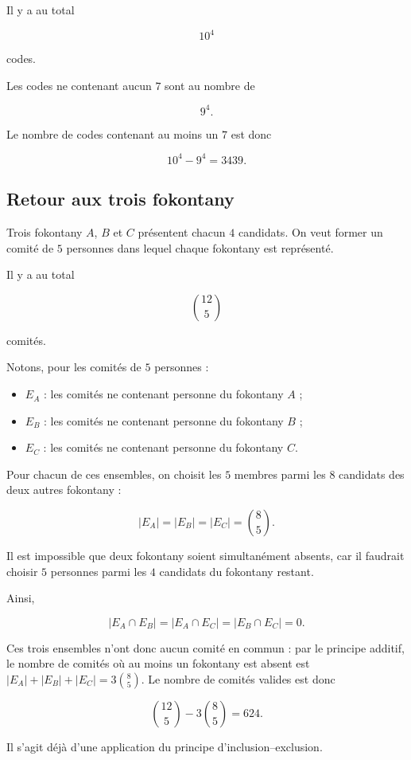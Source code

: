 Il y a au total

\[
10^4
\]

codes.

Les codes ne contenant aucun \(7\) sont au nombre de

\[
9^4.
\]

Le nombre de codes contenant au moins un \(7\) est donc

\[
\boxed{10^4-9^4=3439.}
\]

\subsection{Retour aux trois fokontany}

Trois fokontany \(A\), \(B\) et \(C\) présentent chacun \(4\) candidats.
On veut former un comité de \(5\) personnes dans lequel chaque fokontany est
représenté.

Il y a au total

\[
\binom{12}{5}
\]

comités.

Notons, pour les comités de \(5\) personnes :
\begin{itemize}
    \item \(E_A\) : les comités ne contenant personne du fokontany \(A\) ;
    \item \(E_B\) : les comités ne contenant personne du fokontany \(B\) ;
    \item \(E_C\) : les comités ne contenant personne du fokontany \(C\).
\end{itemize}

Pour chacun de ces ensembles, on choisit les \(5\) membres parmi les \(8\)
candidats des deux autres fokontany :

\[
|E_A|=|E_B|=|E_C|=\binom{8}{5}.
\]

Il est impossible que deux fokontany soient simultanément absents, car il
faudrait choisir \(5\) personnes parmi les \(4\) candidats du fokontany restant.

Ainsi,

\[
|E_A\cap E_B|
=
|E_A\cap E_C|
=
|E_B\cap E_C|
=
0.
\]

Ces trois ensembles n'ont donc aucun comité en commun : par le principe additif, le nombre de
comités où au moins un fokontany est absent est \(|E_A|+|E_B|+|E_C|=3\binom{8}{5}\).
Le nombre de comités valides est donc

\[
\boxed{
\binom{12}{5}
-
3\binom{8}{5}
=
624.
}
\]

Il s'agit déjà d'une application du principe d'inclusion--exclusion.

